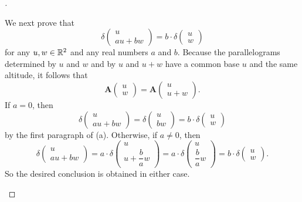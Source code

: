 \begin{proof}[]
\begin{enumerate}
          We next prove that
          \[
            \delta\begin{pmatrix}
              u \\
              au + bw
            \end{pmatrix} = b \cdot \delta\begin{pmatrix}
              u \\
              w
            \end{pmatrix}
          \]
          for any \(u, w \in \mathbb{R}^2\) and any real numbers \(a\) and \(b\).
          Because the parallelograms determined by \(u\) and \(w\) and by \(u\) and \(u + w\) have a common base \(u\) and the same altitude, it follows that
          \[
            \mathbf{A}\begin{pmatrix}
              u \\
              w
            \end{pmatrix} = \mathbf{A}\begin{pmatrix}
              u \\
              u + w
            \end{pmatrix}.
          \]
          If \(a = 0\), then
          \[
            \delta\begin{pmatrix}
              u \\
              au + bw
            \end{pmatrix} = \delta\begin{pmatrix}
              u \\
              bw
            \end{pmatrix} = b \cdot \delta\begin{pmatrix}
              u \\
              w
            \end{pmatrix}
          \]
          by the first paragraph of (a).
          Otherwise, if \(a \neq 0\), then
          \[
            \delta\begin{pmatrix}
              u \\
              au + bw
            \end{pmatrix} = a \cdot \delta\begin{pmatrix}
              u \\
              u + \dfrac{b}{a} w
            \end{pmatrix} = a \cdot \delta\begin{pmatrix}
              u \\
              \dfrac{b}{a} w
            \end{pmatrix} = b \cdot \delta\begin{pmatrix}
              u \\
              w
            \end{pmatrix}.
          \]
          So the desired conclusion is obtained in either case.


\end{enumerate}
\end{proof}
